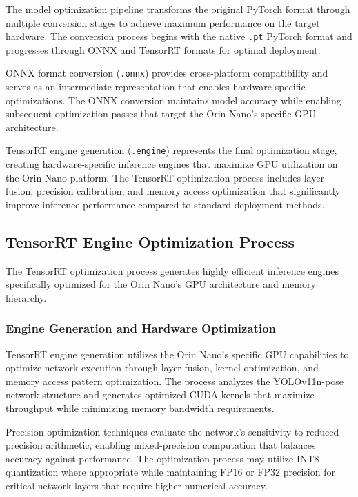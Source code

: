 The model optimization pipeline transforms the original PyTorch format through multiple conversion stages to achieve maximum performance on the target hardware. The conversion process begins with the native \texttt{.pt} PyTorch format and progresses through ONNX and TensorRT formats for optimal deployment.

ONNX format conversion (\texttt{.onnx}) provides cross-platform compatibility and serves as an intermediate representation that enables hardware-specific optimizations. The ONNX conversion maintains model accuracy while enabling subsequent optimization passes that target the Orin Nano's specific GPU architecture.

TensorRT engine generation (\texttt{.engine}) represents the final optimization stage, creating hardware-specific inference engines that maximize GPU utilization on the Orin Nano platform. The TensorRT optimization process includes layer fusion, precision calibration, and memory access optimization that significantly improve inference performance compared to standard deployment methods.

\subsection{TensorRT Engine Optimization Process}

The TensorRT optimization process generates highly efficient inference engines specifically optimized for the Orin Nano's GPU architecture and memory hierarchy.

\subsubsection{Engine Generation and Hardware Optimization}

TensorRT engine generation utilizes the Orin Nano's specific GPU capabilities to optimize network execution through layer fusion, kernel optimization, and memory access pattern optimization. The process analyzes the YOLOv11n-pose network structure and generates optimized CUDA kernels that maximize throughput while minimizing memory bandwidth requirements.

Precision optimization techniques evaluate the network's sensitivity to reduced precision arithmetic, enabling mixed-precision computation that balances accuracy against performance. The optimization process may utilize INT8 quantization where appropriate while maintaining FP16 or FP32 precision for critical network layers that require higher numerical accuracy.

